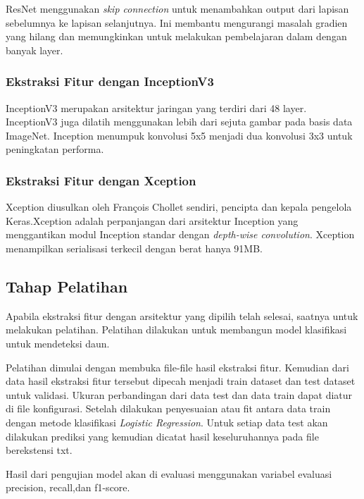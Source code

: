 \par ResNet menggunakan \textit{skip connection} untuk menambahkan output dari lapisan sebelumnya ke lapisan selanjutnya. Ini membantu mengurangi masalah gradien yang hilang dan memungkinkan untuk melakukan pembelajaran dalam dengan banyak layer.

\subsubsection{Ekstraksi Fitur dengan InceptionV3}
\par InceptionV3 merupakan arsitektur jaringan yang terdiri dari 48 layer. InceptionV3 juga dilatih menggunakan lebih dari sejuta gambar pada basis data ImageNet. Inception menumpuk konvolusi 5x5 menjadi dua konvolusi 3x3 untuk peningkatan performa.

\subsubsection{Ekstraksi Fitur dengan Xception}
\par Xception diusulkan oleh François Chollet sendiri, pencipta dan kepala pengelola Keras.Xception adalah perpanjangan dari arsitektur Inception yang menggantikan modul Inception standar dengan \textit{depth-wise convolution}. Xception menampilkan serialisasi terkecil dengan berat hanya 91MB.

\subsection{Tahap Pelatihan}
\par Apabila ekstraksi fitur dengan arsitektur yang dipilih telah selesai, saatnya untuk melakukan pelatihan. Pelatihan dilakukan untuk membangun model klasifikasi untuk mendeteksi daun. 
\par Pelatihan dimulai dengan membuka file-file hasil ekstraksi fitur. Kemudian dari data hasil ekstraksi fitur tersebut dipecah menjadi train dataset dan test dataset untuk validasi. Ukuran perbandingan dari data test dan data train dapat diatur di file konfigurasi. Setelah dilakukan penyesuaian atau fit antara data train dengan metode klasifikasi \textit{Logistic Regression}. Untuk setiap data test akan dilakukan prediksi yang kemudian dicatat hasil keseluruhannya pada file berekstensi txt.
\par Hasil dari pengujian model akan di evaluasi menggunakan variabel evaluasi precision, recall,dan f1-score. 

